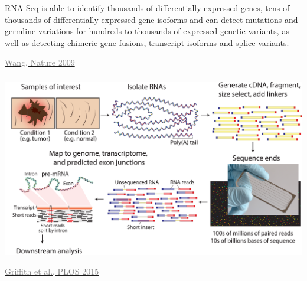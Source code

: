 \documentclass[x11names, svgnames]{beamer}
\begin{document}
%
%
%
\begin{frame}
  \frametitle{\three}
  \begin{center}
  RNA-Seq is able to identify thousands of differentially expressed genes, tens of thousands of differentially expressed gene isoforms and can detect mutations and germline variations for hundreds to thousands of expressed genetic variants, as well as detecting chimeric gene fusions, transcript isoforms and splice variants.
  \end{center}
  \begin{center}
    \vspace{2em}
    \footnotesize{\href{https://doi.org/10.1038/nrg2484}{\textcolor{gray}{Wang, Nature 2009}}}
  \end{center}
\end{frame}
\begin{frame}
  \frametitle{\three}
  \begin{center}
    \includegraphics[scale=0.55]{images/griffith-plos}
  \end{center}
  \begin{center}
    \vspace{1.5em}
    \footnotesize{\href{https://doi.org/10.1371/journal.pcbi.1004393}{\textcolor{gray}{Griffith et al., PLOS 2015}}}
  \end{center}
\end{frame}
\end{document}
